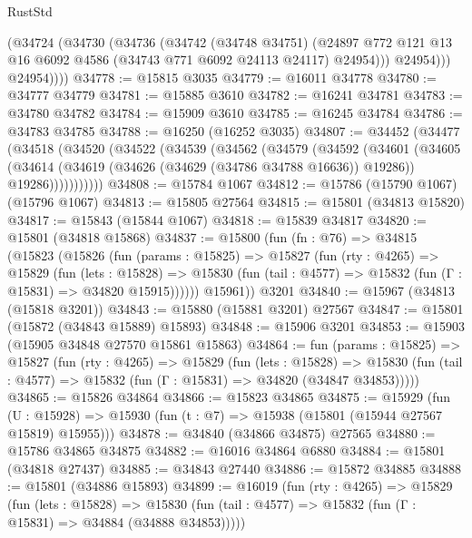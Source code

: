 \begin{lexlean}{RustStd}
\begin{coremodule}
              (@34724
                (@34730
                  (@34736
                    (@34742
                      (@34748 @34751)
                      (@24897
                        @772
                        @121
                        @13
                        @16
                        @6092
                        @4586
                        (@34743 @771 @6092 @24113 @24117)
                        @24954)))
                  @24954)))
            @24954))))
@34778 := @15815 @3035
@34779 := @16011 @34778
@34780 := @34777 @34779
@34781 := @15885 @3610
@34782 := @16241 @34781
@34783 := @34780 @34782
@34784 := @15909 @3610
@34785 := @16245 @34784
@34786 := @34783 @34785
@34788 := @16250 (@16252 @3035)
@34807 := @34452
    (@34477
      (@34518
        (@34520
          (@34522
            (@34539
              (@34562
                (@34579
                  (@34592
                    (@34601
                      (@34605
                        (@34614
                          (@34619 (@34626 (@34629 (@34786 @34788 @16636)) @19286))
                          @19286)))))))))))
@34808 := @15784 @1067
@34812 := @15786 (@15790 @1067) (@15796 @1067)
@34813 := @15805 @27564
@34815 := @15801 (@34813 @15820)
@34817 := @15843 (@15844 @1067)
@34818 := @15839 @34817
@34820 := @15801 (@34818 @15868)
@34837 := @15800
    (fun (fn : @76) =>
    @34815
      (@15823
        (@15826
          (fun (params : @15825) =>
          @15827
            (fun (rty : @4265) =>
            @15829
              (fun (lets : @15828) =>
              @15830 (fun (tail : @4577) => @15832 (fun (Γ : @15831) => @34820 @15915))))))
        @15961))
    @3201
@34840 := @15967 (@34813 (@15818 @3201))
@34843 := @15880 (@15881 @3201) @27567
@34847 := @15801 (@15872 (@34843 @15889) @15893)
@34848 := @15906 @3201
@34853 := @15903 (@15905 @34848 @27570 @15861 @15863)
@34864 := fun (params : @15825) =>
  @15827
    (fun (rty : @4265) =>
    @15829
      (fun (lets : @15828) =>
      @15830 (fun (tail : @4577) => @15832 (fun (Γ : @15831) => @34820 (@34847 @34853)))))
@34865 := @15826 @34864
@34866 := @15823 @34865
@34875 := @15929
    (fun (U : @15928) => @15930 (fun (t : @7) => @15938 (@15801 (@15944 @27567 @15819) @15955)))
@34878 := @34840 (@34866 @34875) @27565
@34880 := @15786 @34865 @34875
@34882 := @16016 @34864 @6880
@34884 := @15801 (@34818 @27437)
@34885 := @34843 @27440
@34886 := @15872 @34885
@34888 := @15801 (@34886 @15893)
@34899 := @16019
    (fun (rty : @4265) =>
    @15829
      (fun (lets : @15828) =>
      @15830 (fun (tail : @4577) => @15832 (fun (Γ : @15831) => @34884 (@34888 @34853)))))

\end{coremodule}
\end{lexlean}
